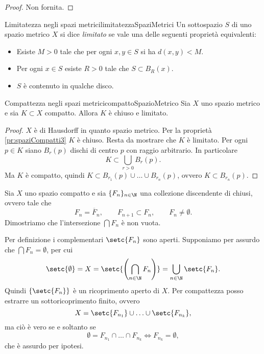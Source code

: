 \begin{proof}
	Non fornita.
\end{proof}

\begin{defn}{Limitatezza negli spazi metrici}{limitatezzaSpaziMetrici}
	Un sottospazio \(S\) di uno spazio metrico \(X\) si dice \emph{limitato} se vale una delle seguenti proprietà equivalenti:
	\begin{itemize}
		\item Esiste \(M>0\) tale che per ogni \(x,y\in S\) si ha \(d(x,y)<M\).
		\item Per ogni \(x\in S\) esiste \(R>0\) tale che \(S\subset B_R(x)\).
		\item \(S\) è contenuto in qualche disco.
	\end{itemize}
\end{defn}

\begin{prop}{Compattezza negli spazi metrici}{compattoSpazioMetrico}
	Sia \(X\) uno spazio metrico e sia \(K\subset X\) compatto.
	Allora \(K\) è chiuso e limitato.
\end{prop}

\begin{proof}
	\(X\) è di Hausdorff in quanto spazio metrico.
	Per la proprietà \ref{pr:spaziCompatti3} \(K\) è chiuso.
	Resta da mostrare che \(K\) è limitato.
	Per ogni \(p\in K\) siano \(B_r(p)\) dischi di centro \(p\) con raggio arbitrario.
	In particolare
	\[
		K \subset \bigcup_{r>0} B_r(p).
	\]
	Ma \(K\) è compatto, quindi \(K\subset B_{r_1}(p) \cup \ldots \cup B_{r_n}(p)\), ovvero \(K\subset B_{r_n}(p)\).
\end{proof}
%
%
\begin{ese}
	Sia \(X\) uno spazio compatto e sia \(\{F_n\}_{n\in\N}\) una collezione discendente di chiusi, ovvero tale che
	\[
		F_n = \overline{F}_n, \qquad F_{n+1}\subset F_n, \qquad F_n \neq \emptyset.
	\]
	Dimostriamo che l'intersezione \(\bigcap F_n\) è non vuota.

	Per definizione i complementari \(\setc{F_n}\) sono aperti.
	Supponiamo per assurdo che \(\bigcap F_n=\emptyset\), per cui
	\[
		\setc{\emptyset} = X = \setc{\left( \bigcap_{n\in\N} F_n \right)} = \bigcup_{n\in\N} \setc{F_n}.
	\]
	Quindi \(\{\setc{F_n}\}\) è un ricoprimento aperto di \(X\).
	Per compattezza posso estrarre un sottoricoprimento finito, ovvero
	\[
		X = \setc{F_{n_1}} \cup \ldots \cup \setc{F_{n_k}},
	\]
	ma ciò è vero se e soltanto se
	\[
		\emptyset = F_{n_1} \cap \ldots \cap F_{n_k} \iff F_{n_k} = \emptyset,
	\]
	che è assurdo per ipotesi.
\end{ese}

